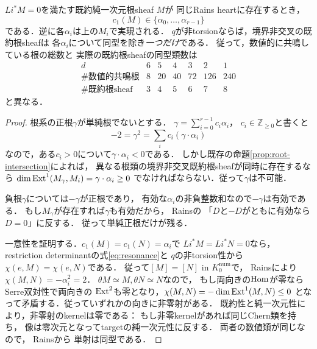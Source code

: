 \begin{theorem}[実在する既約根はちょうど単純根]
\label{thm:only-simple-irreducible}
$Li^*M=0$を満たす既約純一次元根sheaf $M$が
同じRains heartに存在するとき，
\[
 c_1(M)\in\{\alpha_0,\ldots,\alpha_{r-1}\}
\]
である．逆に各$\alpha_i$は上の$M_i$で実現される．
$q$が非torsionならば，境界非交叉の既約根sheafは
各$\alpha_i$について同型を除き\emph{一つだけ}である．
従って，数値的に共鳴している根の総数と
実際の既約根sheafの同型類数は
\[
\begin{array}{c|rrrrrr}
d&6&5&4&3&2&1\\\hline
\#\text{数値的共鳴根}&8&20&40&72&126&240\\
\#\text{既約根sheaf}&3&4&5&6&7&8
\end{array}
\]
と異なる．
\end{theorem}
\begin{proof}
根系の正根$\gamma$が単純根でないとする．
$\gamma=\sum_{i=0}^{r-1}c_i\alpha_i$，
$c_i\in\mathbb Z_{\ge0}$と書くと
\[
 -2=\gamma^2=\sum_i c_i(\gamma\cdot\alpha_i)
\]
なので，ある$c_i>0$について$\gamma\cdot\alpha_i<0$である．
しかし既存の命題\ref{prop:root-intersection}によれば，
異なる根類の境界非交叉既約根sheafが同時に存在するなら
$\dim\operatorname{Ext}^1(M_\gamma,M_i)=\gamma\cdot\alpha_i\ge0$
でなければならない．従って$\gamma$は不可能．

負根$\gamma$については$-\gamma$が正根であり，
有効な$\alpha_i$の非負整数和なので$-\gamma$は有効である．
もし$M_\gamma$が存在すれば$\gamma$も有効だから，
Rains\cite[Proposition 7.19]{RainsBirational}の
「$D$と$-D$がともに有効なら$D=0$」に反する．
従って単純正根だけが残る．

一意性を証明する．$c_1(M)=c_1(N)=\alpha_i$で
$Li^*M=Li^*N=0$なら，
restriction determinantの式\eqref{eq:resonance}と
$q$の非torsion性から
$\chi(e,M)=\chi(e,N)$である．
従って$[M]=[N]$ in $K_0^{\mathrm{num}}$で，
Rains\cite[Corollary 7.13]{RainsBirational}により
$\chi(M,N)=-\alpha_i^2=2$．
$\theta M\simeq M,\theta N\simeq N$なので，
もし両向きの$\operatorname{Hom}$が零ならSerre双対性で両向きの
$\operatorname{Ext}^2$も零となり，$\chi(M,N)=-\dim\operatorname{Ext}^1(M,N)\le0$
となって矛盾する．従っていずれかの向きに非零射がある．
既約性と純一次元性により，非零射のkernelは零である：
もし非零kernelがあれば同じChern類を持ち，
像は零次元となってtargetの純一次元性に反する．
両者の数値類が同じなので，
Rains\cite[Corollary 7.7]{RainsBirational}から
単射は同型である．
\end{proof}

